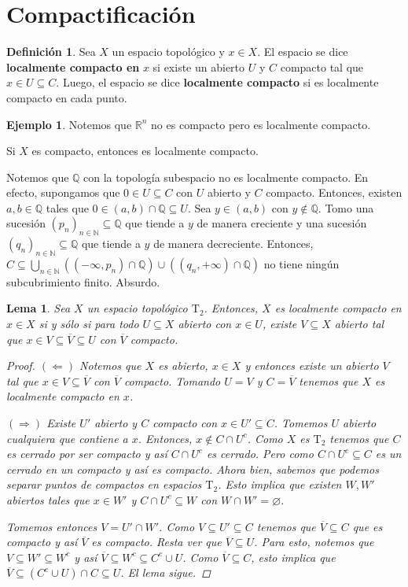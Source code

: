 \documentclass[12pt]{book}
\newtheorem{lem}[teo]{Lema}
\theoremstyle{definition}
\newtheorem{defn}[teo]{Definición}
\newtheorem{ex}[teo]{Ejemplo}
\newcommand{\RR}{\mathbb{R}}      %
\newcommand{\NN}{\mathbb{N}}
\newcommand{\QQ}{\mathbb{Q}}
\let\emptyset\varnothing
\begin{document}
\section{Compactificación}

\begin{defn}
Sea $X$ un espacio topológico y $x\in X$. El espacio se dice \textbf{localmente compacto en} $x$ si existe un abierto $U$ y $C$ compacto tal que $x\in U\subseteq C$. Luego, el espacio se dice \textbf{localmente compacto} si es localmente compacto en cada punto.
\end{defn}

\begin{ex}
Notemos que $\RR^n$ no es compacto pero es localmente compacto. 

Si $X$ es compacto, entonces es localmente compacto. 

Notemos que $\QQ$ con la topología subespacio no es localmente compacto. En efecto, supongamos que $0\in U\subseteq C$ con $U$ abierto y $C$ compacto. Entonces, existen $a,b\in\QQ$ tales que $0\in (a,b)\cap \QQ \subseteq U$. Sea $y\in (a,b)$ con $y\notin\QQ$. Tomo una sucesión $(p_n)_{n\in\NN}\subseteq\QQ$ que tiende a $y$ de manera creciente y una sucesión $(q_n)_{n\in\NN}\subseteq\QQ$ que tiende a $y$ de manera decreciente. Entonces, $C\subseteq\displaystyle\bigcup_{n\in\NN} ((-\infty,p_n)\cap\QQ)\cup((q_n,+\infty)\cap\QQ)$ no tiene ningún subcubrimiento finito. Absurdo. 
\end{ex}

\begin{lem}
Sea $X$ un espacio topológico $\mathrm{T}_2$. Entonces, $X$ es localmente compacto en $x\in X$ si y sólo si para todo $U\subseteq X$ abierto con $x\in U$, existe $V\subseteq X$ abierto tal que $x\in V\subseteq \overline{V}\subseteq U$ con $\overline{V}$ compacto.
\begin{proof}
$(\Longleftarrow)$ Notemos que $X$ es abierto, $x\in X$ y entonces existe un abierto $V$ tal que $x\in V\subseteq\overline{V}$ con $\overline{V}$ compacto. Tomando $U=V$ y $C=\overline{V}$ tenemos que $X$ es localmente compacto en $x$.

$(\Longrightarrow)$ Existe $U'$ abierto y $C$ compacto con $x\in U'\subseteq C$. Tomemos $U$ abierto cualquiera que contiene a $x$. Entonces, $x\notin C\cap U^c$. Como $X$ es $\mathrm{T}_2$ tenemos que $C$ es cerrado por ser compacto y así $C\cap U^c$ es cerrado. Pero como $C\cap U^c\subseteq C$ es un cerrado en un compacto y así es compacto. Ahora bien, sabemos que podemos separar puntos de compactos en espacios $\mathrm{T}_2$. Esto implica que existen $W,W'$ abiertos tales que $x\in W'$ y $C\cap U^c \subseteq W$ con $W\cap W'=\emptyset$.

Tomemos entonces $V=U'\cap W'$. Como $V\subseteq U'\subseteq C$ tenemos que $\overline{V}\subseteq C$ que es compacto y así $\overline{V}$ es compacto. Resta ver que $\overline{V}\subseteq U$. Para esto, notemos que $V\subseteq W'\subseteq W^c$ y así $\overline{V}\subseteq W^c\subseteq C^c\cup U$. Como $\overline{V}\subseteq C$, esto implica que $\overline{V}\subseteq (C^c\cup U)\cap C \subseteq U$. El lema sigue. 
\end{proof}
\end{lem}
\end{document}
